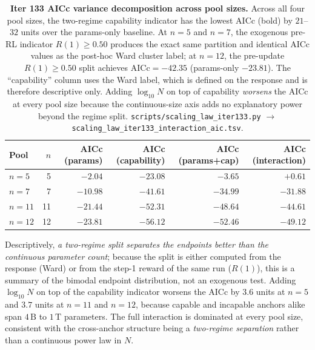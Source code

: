\begin{table}[t]
  \centering
  \small
  \begin{tabular}{lrrrrr}
    \toprule
    Pool & $n$ & AICc (params) & AICc (capability) &
           AICc (params+cap) & AICc (interaction) \\
    \midrule
    $n=5$  &  5 & $-2.04$  & $\mathbf{-23.08}$ & $-3.65$  & $+0.61$ \\
    $n=7$  &  7 & $-10.98$ & $\mathbf{-41.61}$ & $-34.99$ & $-31.88$ \\
    $n=11$ & 11 & $-21.44$ & $\mathbf{-52.31}$ & $-48.64$ & $-44.61$ \\
    $n=12$ & 12 & $-23.81$ & $\mathbf{-56.12}$ & $-52.46$ & $-49.12$ \\
    \bottomrule
  \end{tabular}
  \caption{\textbf{Iter 133 AICc variance decomposition across pool sizes.}
    Across all four pool sizes, the two-regime capability indicator has
    the lowest AICc (bold) by $21$--$32$ units over the params-only
    baseline.  At $n=5$ and $n=7$, the exogenous pre-RL indicator
    $R(1) \ge 0.50$ produces the exact same partition and identical
    AICc values as the post-hoc Ward cluster label; at $n=12$, the
    pre-update $R(1) \ge 0.50$ split achieves $\mathrm{AICc} = -42.35$
    (params-only $-23.81$).  The ``capability'' column uses the Ward
    label, which is defined on the response and is therefore
    descriptive only.  Adding
    $\log_{10} N$ on top of capability \emph{worsens} the AICc at every
    pool size because the continuous-size axis adds no explanatory
    power beyond the regime split.
    \texttt{scripts/scaling\_law\_iter133.py}
    $\to$ \texttt{scaling\_law\_iter133\_interaction\_aic.tsv}.}
  \label{tab:scaling-iter133-aic}
\end{table}

Descriptively, \emph{a two-regime split separates the endpoints
better than the continuous parameter count}; because the split is
either computed from the response (Ward) or from the step-1 reward of
the same run ($R(1)$), this is a summary of the bimodal endpoint
distribution, not an exogenous test.
Adding $\log_{10} N$ on top of the capability indicator worsens the
AICc by $3.6$ units at $n=5$ and $3.7$ units at $n=11$ and $n=12$,
because capable and incapable anchors alike span $4\,\text{B}$ to
$1\,\text{T}$ parameters.  The full interaction is dominated at every
pool size, consistent with the cross-anchor structure being a
\emph{two-regime separation} rather than a continuous power law in
$N$.

